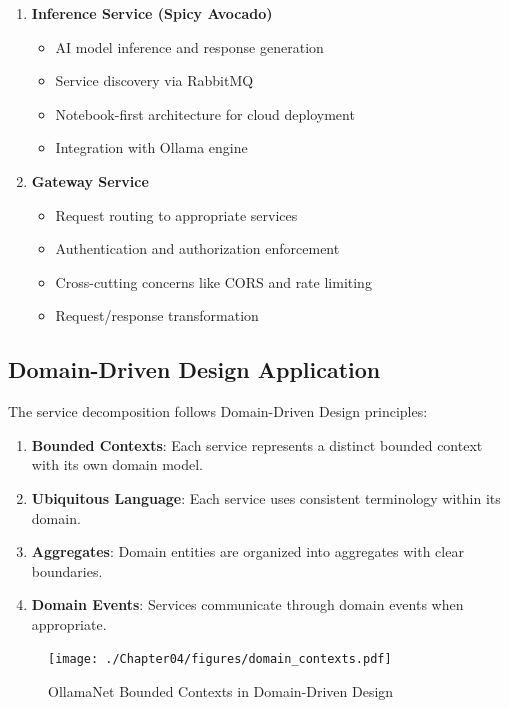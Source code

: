 \begin{enumerate}
   \item \textbf{Inference Service (Spicy Avocado)}
   \begin{itemize}
      \item AI model inference and response generation
      \item Service discovery via RabbitMQ
      \item Notebook-first architecture for cloud deployment
      \item Integration with Ollama engine
   \end{itemize}

   \item \textbf{Gateway Service}
   \begin{itemize}
      \item Request routing to appropriate services
      \item Authentication and authorization enforcement
      \item Cross-cutting concerns like CORS and rate limiting
      \item Request/response transformation
   \end{itemize}
\end{enumerate}

\subsection{Domain-Driven Design Application}

The service decomposition follows Domain-Driven Design principles:

\begin{enumerate}
   \item \textbf{Bounded Contexts}: Each service represents a distinct bounded context with its own domain model.
   \item \textbf{Ubiquitous Language}: Each service uses consistent terminology within its domain.
   \item \textbf{Aggregates}: Domain entities are organized into aggregates with clear boundaries.
   \item \textbf{Domain Events}: Services communicate through domain events when appropriate.
\end{enumerate}

\begin{figure}
    \centering
    \texttt{[image: ./Chapter04/figures/domain\_contexts.pdf]}
    \caption{OllamaNet Bounded Contexts in Domain-Driven Design}
    \label{fig:domain-contexts}
\end{figure}
\clearpage

